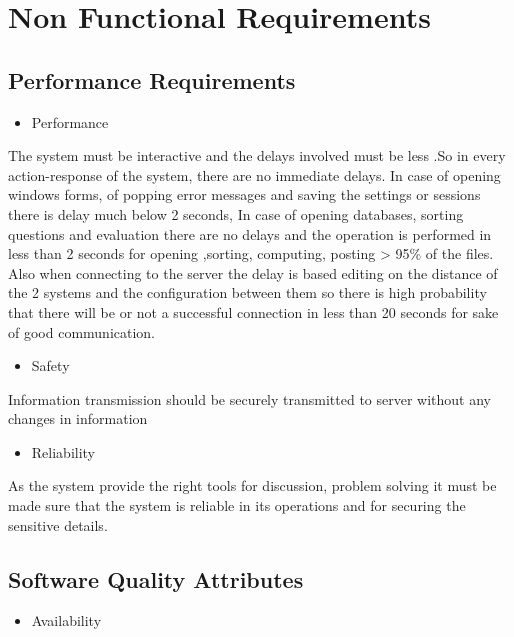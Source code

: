 \documentclass[letterpaper,10pt,english]{sphinxmanual}
\begin{document}
\chapter{Non Functional Requirements}
\label{unifieddoc:non-functional-requirements}

\section{Performance Requirements}
\label{unifieddoc:performance-requirements}\begin{itemize}
\item {} 
Performance

\end{itemize}

The system must be interactive and the delays involved must be less .So in every action-response of the system, there are no immediate delays. In case of opening windows forms, of popping error messages and saving the settings or sessions there is delay much below 2 seconds, In case of opening databases, sorting questions and evaluation there are no delays and the operation is performed in less than 2 seconds for opening ,sorting, computing, posting \textgreater{} 95\% of the files. Also when connecting to the server the delay is based editing on the distance of the 2 systems and the configuration between them so there is high probability that there will be or not a successful connection in less than 20 seconds for sake of good communication.
\begin{itemize}
\item {} 
Safety

\end{itemize}

Information transmission should be securely transmitted to server without any changes in information
\begin{itemize}
\item {} 
Reliability

\end{itemize}

As the system provide the right tools for discussion, problem solving it must be made sure that the system is reliable in its operations and for securing the sensitive details.


\section{Software Quality Attributes}
\label{unifieddoc:software-quality-attributes}\begin{itemize}
\item {} 
Availability

\end{itemize}
\end{document}
